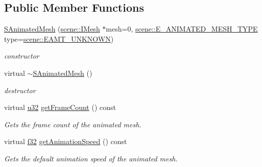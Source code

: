 \subsection*{Public Member Functions}
\begin{DoxyCompactItemize}
\item 
\mbox{\label{structirr_1_1scene_1_1SAnimatedMesh_a9f02f671b75c1009b35bf7d49f277c8d}} 
\hyperlink{structirr_1_1scene_1_1SAnimatedMesh_a9f02f671b75c1009b35bf7d49f277c8d}{S\+Animated\+Mesh} (\hyperlink{classirr_1_1scene_1_1IMesh}{scene\+::\+I\+Mesh} $\ast$mesh=0, \hyperlink{namespaceirr_1_1scene_a2fc85a64604521ca063f1881b5dd1c61}{scene\+::\+E\+\_\+\+A\+N\+I\+M\+A\+T\+E\+D\+\_\+\+M\+E\+S\+H\+\_\+\+T\+Y\+PE} type=\hyperlink{namespaceirr_1_1scene_a2fc85a64604521ca063f1881b5dd1c61a2db2999504900cad42b9295f4198434f}{scene\+::\+E\+A\+M\+T\+\_\+\+U\+N\+K\+N\+O\+WN})
\begin{DoxyCompactList}\small\item\em constructor \end{DoxyCompactList}\item 
\mbox{\label{structirr_1_1scene_1_1SAnimatedMesh_a59d891b250eb3803b1af81adba447593}} 
virtual \hyperlink{structirr_1_1scene_1_1SAnimatedMesh_a59d891b250eb3803b1af81adba447593}{$\sim$\+S\+Animated\+Mesh} ()
\begin{DoxyCompactList}\small\item\em destructor \end{DoxyCompactList}\item 
virtual \hyperlink{namespaceirr_a0416a53257075833e7002efd0a18e804}{u32} \hyperlink{structirr_1_1scene_1_1SAnimatedMesh_a58d8940d3002792194c74e209a5f2949}{get\+Frame\+Count} () const
\begin{DoxyCompactList}\small\item\em Gets the frame count of the animated mesh. \end{DoxyCompactList}\item 
virtual \hyperlink{namespaceirr_a0277be98d67dc26ff93b1a6a1d086b07}{f32} \hyperlink{structirr_1_1scene_1_1SAnimatedMesh_aa6b6302dad72761e22ba10cc4486b4c8}{get\+Animation\+Speed} () const
\begin{DoxyCompactList}\small\item\em Gets the default animation speed of the animated mesh. \end{DoxyCompactList}\item 

\end{DoxyCompactItemize}
